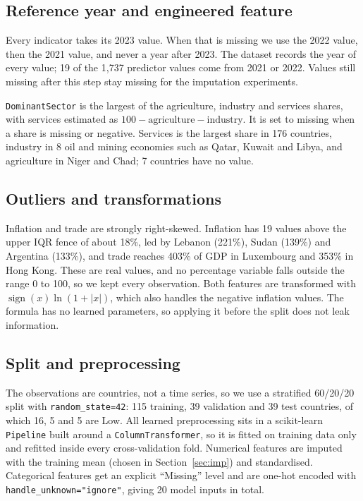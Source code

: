 \documentclass[10pt,a4paper]{article}
\newcommand{\code}[1]{\texttt{\small #1}}
\begin{document}
\subsection{Reference year and engineered feature}
Every indicator takes its 2023 value. When that is missing we use the 2022 value, then the 2021 value, and never a
year after 2023. The dataset records the year of every value; 19 of the 1{,}737 predictor values come from 2021 or
2022. Values still missing after this step stay missing for the imputation experiments.

\code{DominantSector} is the largest of the agriculture, industry and services shares, with services estimated as
$100 - \text{agriculture} - \text{industry}$. It is set to missing when a share is missing or negative. Services is
the largest share in 176 countries, industry in 8 oil and mining economies such as Qatar, Kuwait and Libya, and
agriculture in Niger and Chad; 7 countries have no value.

\subsection{Outliers and transformations}
Inflation and trade are strongly right-skewed. Inflation has 19 values above the upper IQR fence of about 18\%, led
by Lebanon (221\%), Sudan (139\%) and Argentina (133\%), and trade reaches 403\% of GDP in Luxembourg and 353\% in
Hong Kong. These are real values, and no percentage variable falls outside the range 0 to 100, so we kept every
observation. Both features are transformed with $\operatorname{sign}(x)\ln(1+|x|)$, which also handles the
negative inflation values. The formula has no learned parameters, so applying it before the split does not leak
information.

\subsection{Split and preprocessing}
The observations are countries, not a time series, so we use a stratified 60/20/20 split with
\code{random\_state=42}: 115 training, 39 validation and 39 test countries, of which 16, 5 and 5 are Low. All
learned preprocessing sits in a scikit-learn \code{Pipeline} built around a \code{ColumnTransformer}, so it is
fitted on training data only and refitted inside every cross-validation fold. Numerical features are imputed with
the training mean (chosen in Section~\ref{sec:imp}) and standardised. Categorical features get an explicit
``Missing'' level and are one-hot encoded with \code{handle\_unknown="ignore"}, giving 20 model inputs in total.
\end{document}
